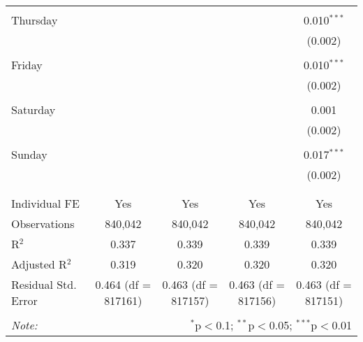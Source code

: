 \documentclass[
]{article}
\begin{document}
\begin{table}[!htbp]
{\begin{tabular}{@{\extracolsep{5pt}}lcccc}
  & & & & \\ 
 Thursday &  &  &  & 0.010$^{***}$ \\ 
  &  &  &  & (0.002) \\ 
  & & & & \\ 
 Friday &  &  &  & 0.010$^{***}$ \\ 
  &  &  &  & (0.002) \\ 
  & & & & \\ 
 Saturday &  &  &  & 0.001 \\ 
  &  &  &  & (0.002) \\ 
  & & & & \\ 
 Sunday &  &  &  & 0.017$^{***}$ \\ 
  &  &  &  & (0.002) \\ 
  & & & & \\ 
\hline \\[-1.8ex] 
Individual FE & Yes & Yes & Yes & Yes \\ 
Observations & 840,042 & 840,042 & 840,042 & 840,042 \\ 
R$^{2}$ & 0.337 & 0.339 & 0.339 & 0.339 \\ 
Adjusted R$^{2}$ & 0.319 & 0.320 & 0.320 & 0.320 \\ 
Residual Std. Error & 0.464 (df = 817161) & 0.463 (df = 817157) & 0.463 (df = 817156) & 0.463 (df = 817151) \\ 
\hline 
\hline \\[-1.8ex] 
\textit{Note:}  & \multicolumn{4}{r}{$^{*}$p$<$0.1; $^{**}$p$<$0.05; $^{***}$p$<$0.01} \\ 
\end{tabular}
} 
\end{table} 
\newpage
\end{document}
